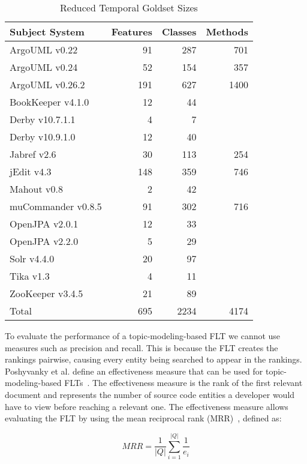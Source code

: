 \begin{table}[t]
\renewcommand{\arraystretch}{1.3}
\footnotesize
\centering
\caption{Reduced Temporal Goldset Sizes}
\begin{tabular}{lrrr}
    \toprule
    Subject System      & Features  & Classes   & Methods \\
    \midrule
    ArgoUML v0.22 & 91 & 287 & 701 \\
    ArgoUML v0.24 & 52 & 154 & 357 \\
    ArgoUML v0.26.2 & 191 & 627 & 1400 \\
    BookKeeper v4.1.0 & 12 & 44 &   \\
    Derby v10.7.1.1 & 4 & 7 &   \\
    Derby v10.9.1.0 & 12 & 40 &   \\
    Jabref v2.6 & 30 & 113 & 254 \\
    jEdit v4.3 & 148 & 359 & 746 \\
    Mahout v0.8 & 2 & 42 &   \\
    muCommander v0.8.5 & 91 & 302 & 716 \\
    OpenJPA v2.0.1 & 12 & 33 &   \\
    OpenJPA v2.2.0 & 5 & 29 &   \\
    Solr v4.4.0 & 20 & 97 &   \\
    Tika v1.3 & 4 & 11 &   \\
    ZooKeeper v3.4.5 & 21 & 89 &   \\
    \midrule
Total & 695 & 2234 & 4174
\end{tabular}
\label{table:subjects:temporal}
\end{table}

To evaluate the performance of a topic-modeling-based FLT we cannot use
measures such as precision and recall. This is because the FLT creates
the rankings pairwise, causing every entity being searched to appear in the rankings.
Poshyvanky et al. define an effectiveness measure that can be used for topic-modeling-based FLTs~\cite{Poshyvanyk-etal:2007}.
The effectiveness measure is the rank of the first relevant document
and represents the number of source code entities a developer would have to view before reaching a relevant one.
The effectiveness measure allows evaluating the FLT by using
the mean reciprocal rank (MRR)~\cite{Voorhees:1999}, defined as:

\begin{equation}
    MRR = \frac{1}{|Q|} \sum_{i=1}^{|Q|} \frac{1}{e_i}
\end{equation}

